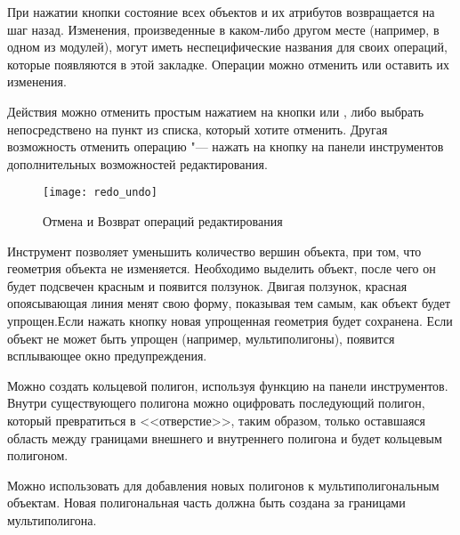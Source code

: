 При нажатии кнопки  состояние всех объектов и их атрибутов
возвращается на шаг назад. Изменения, произведенные в каком-либо другом
месте (например, в одном из модулей), могут иметь неспецифические названия
для своих операций, которые появляются в этой закладке. Операции можно
отменить или оставить их изменения.

Действия можно отменить простым нажатием на кнопки  или
, либо выбрать непосредствено на пункт из списка, который
хотите отменить. Другая возможность отменить операцию "--- нажать на кнопку
 на панели инструментов дополнительных возможностей
редактирования.

\begin{figure}[ht]
   \centering
   \texttt{[image: redo\_undo]}
   \caption{Отмена и Возврат операций редактирования \nixcaption}\label{fig:vector_redoundo}
\end{figure}


Инструмент  позволяет уменьшить
количество вершин объекта, при том, что геометрия объекта не изменяется.
Необходимо выделить объект, после чего он будет подсвечен красным и появится
ползунок. Двигая ползунок, красная опоясывающая линия менят свою форму,
показывая тем самым, как объект будет упрощен.Если нажать кнопку 
новая упрощенная геометрия будет сохранена. Если объект не может быть
упрощен (например, мультиполигоны), появится всплывающее окно предупреждения.


Можно создать кольцевой полигон, используя функцию
 на панели инструментов. Внутри
существующего полигона можно оцифровать последующий полигон, который
превратиться в <<отверстие>>, таким образом, только оставшаяся область
между границами внешнего и внутреннего полигона и будет кольцевым полигоном.


Можно использовать 
для добавления новых полигонов к мультиполигональным объектам. Новая
полигональная часть должна быть создана за границами мультиполигона.



